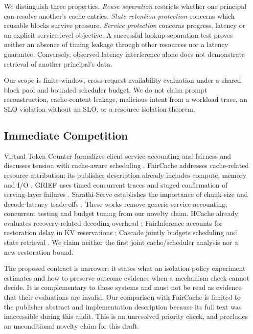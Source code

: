 \documentclass[a4paper,twoside]{article}
\begin{document}
We distinguish three properties. \emph{Reuse separation} restricts whether one principal can resolve another's cache entries. \emph{State retention protection} concerns which reusable blocks survive pressure. \emph{Service protection} concerns progress, latency or an explicit service-level objective. A successful lookup-separation test proves neither an absence of timing leakage through other resources nor a latency guarantee. Conversely, observed latency interference alone does not demonstrate retrieval of another principal's data.

Our scope is finite-window, cross-request availability evaluation under a shared block pool and bounded scheduler budget. We do not claim prompt reconstruction, cache-content leakage, malicious intent from a workload trace, an SLO violation without an SLO, or a resource-isolation theorem.

\subsection{Immediate Competition}

Virtual Token Counter formalizes client service accounting and fairness and discusses tension with cache-aware scheduling \cite{vtc}. FairCache addresses cache-related resource attribution; its publisher description already includes compute, memory and I/O \cite{faircache}. GRIEF uses timed concurrent traces and staged confirmation of serving-layer failures \cite{grief}. Sarathi-Serve establishes the importance of chunk-size and decode-latency trade-offs \cite{sarathi}. These works remove generic service accounting, concurrent testing and budget tuning from our novelty claim. HCache already evaluates recovery-related decoding overhead \cite{hcache}; FairInference accounts for restoration delay in KV reservations \cite{fairinference}; Cascade jointly budgets scheduling and state retrieval \cite{cascade}. We claim neither the first joint cache/scheduler analysis nor a new restoration bound.

The proposed contract is narrower: it states what an isolation-policy experiment estimates and how to preserve outcome evidence when a mechanism check cannot decide. It is complementary to those systems and must not be read as evidence that their evaluations are invalid. Our comparison with FairCache is limited to the publisher abstract and implementation description because its full text was inaccessible during this audit. This is an unresolved priority check, and precludes an unconditional novelty claim for this draft.
\end{document}
